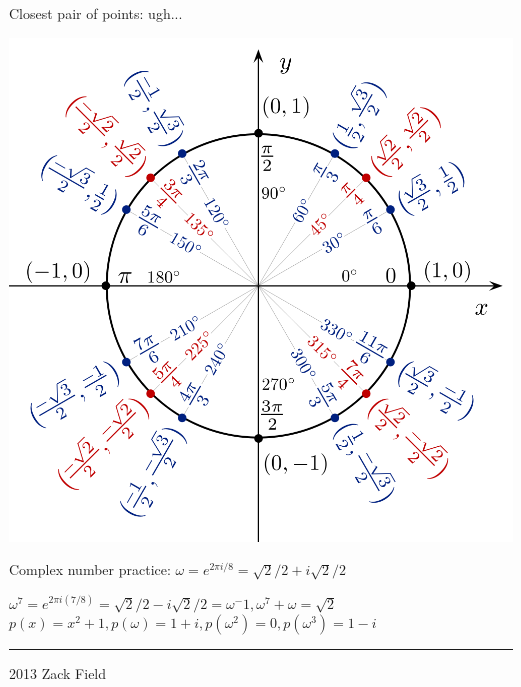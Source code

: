 \documentclass[10pt,landscape]{article}
\newenvironment{Figure}
  {\par\medskip\noindent\minipage{\linewidth}}
  {\endminipage\par\medskip}
\newcommand\myfigure[1]{%
\medskip\noindent\begin{minipage}{\columnwidth}
\centering%
#1%
\end{minipage}\medskip}
\begin{document}
\begin{multicols}{3}
Closest pair of points: ugh...
\begin{Figure}
 \includegraphics[scale=0.2]{unit_circle_2}
\end{Figure}
%
%

Complex number practice: $\omega = e^{2\pi i/8}=\sqrt{2}/2 + i\sqrt{2}/2$

$\omega^7 = e^{2\pi i (7/8)}=\sqrt{2}/2 - i\sqrt{2}/2=\omega^-1,\omega^7 + \omega = \sqrt{2}$
$p(x)=x^2+1, p(\omega)=1+i,p(\omega^2)=0,p(\omega^3)=1-i$



\rule{0.3\linewidth}{0.25pt}
\scriptsize

2013 Zack Field


\end{multicols}
\end{document}
